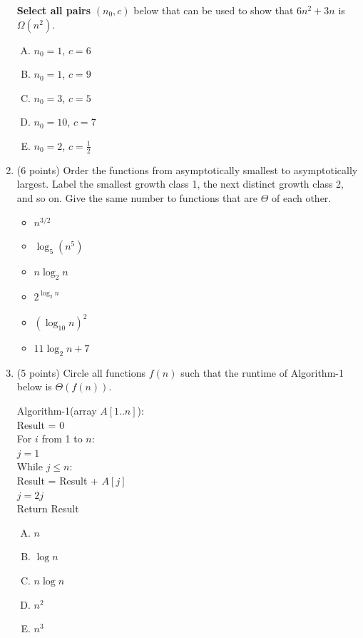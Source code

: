 \documentclass[11pt]{article}
\begin{document}
\begin{enumerate}
\textbf{Select all pairs} $(n_0,c)$ below that can be used to show that $6n^2+3n$ is $\Omega(n^2)$.
\begin{enumerate}[A.]
\item $n_0=1$, $c=6$
\item $n_0=1$, $c=9$
\item $n_0=3$, $c=5$
\item $n_0=10$, $c=7$
\item $n_0=2$, $c=\tfrac12$
\end{enumerate}
\newpage
\item (6 points) Order the functions from asymptotically smallest to asymptotically largest. Label the smallest growth class 1, the next distinct growth class 2, and so on. Give the same number to functions that are $\Theta$ of each other. 
\begin{itemize}
\item[\underline{\hspace{.6cm}}] $n^{3/2}$
\item[\underline{\hspace{.6cm}}] $\log_5(n^5)$
\item[\underline{\hspace{.6cm}}] $n\log_2 n$
\item[\underline{\hspace{.6cm}}] $2^{\log_2 n}$
\item[\underline{\hspace{.6cm}}] $(\log_{10} n)^2$
\item[\underline{\hspace{.6cm}}] $11\log_2 n+7$
\end{itemize}
\vspace{.35in}
\item (5 points) Circle all functions $f(n)$ such that the runtime of Algorithm-1 below is $\Theta(f(n))$.
\begin{algo}
Algorithm-1(array $A[1..n]$):\+\\
Result = 0\\
For $i$ from 1 to $n$:\+\\
$j=1$\\
While $j\leq n$:\+\\
Result = Result + $A[j]$\\
$j=2j$\-\-\\
Return Result
\end{algo}
\begin{enumerate}[A.]
\item $n$
\item $\log n$
\item $n\log n$
\item $n^2$
\item $n^3$
\end{enumerate}


\end{enumerate}
\end{document}
